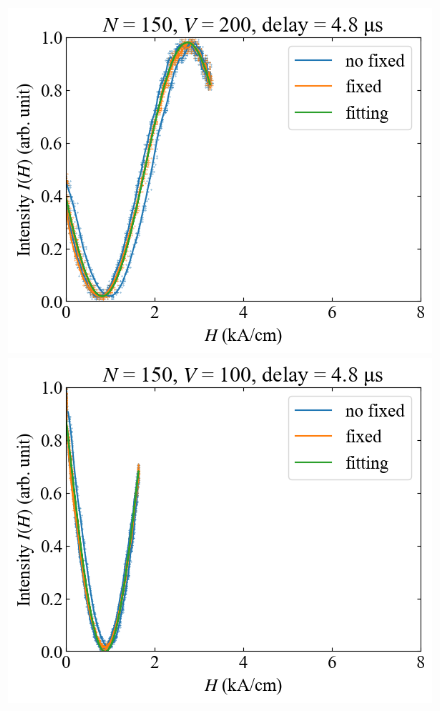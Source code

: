 \documentclass[9pt,dvipdfmx,a4paper]{jsarticle}
\begin{document}
\begin{figure}[H]
\begin{minipage}[t]{0.24\columnwidth}
        \centering
        \includegraphics[width = \columnwidth]{xy/19.png}
    \end{minipage}
    \hfill
    \begin{minipage}[t]{0.24\columnwidth}
        \centering
        \includegraphics[width = \columnwidth]{xy/20.png}
    \end{minipage}
\end{figure}
\end{document}
